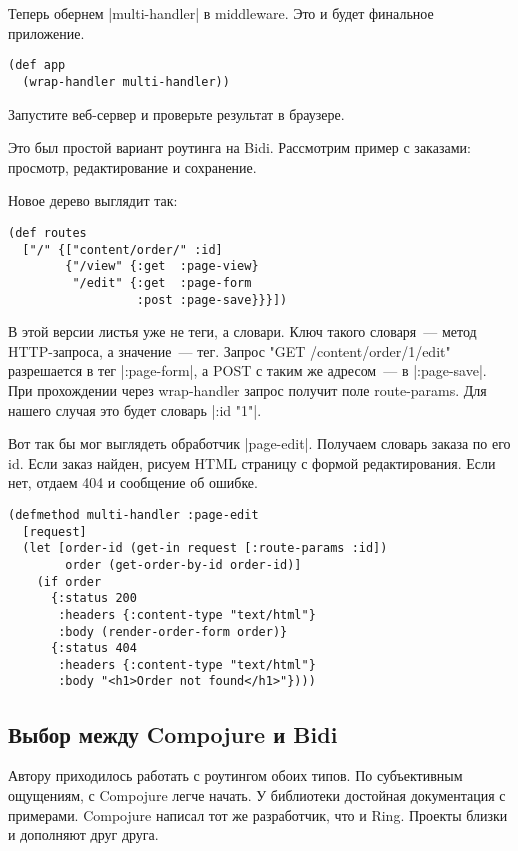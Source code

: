 Теперь обернем \spverb|multi-handler| в middleware. Это и будет финальное приложение.

\begin{verbatim}
(def app
  (wrap-handler multi-handler))
\end{verbatim}

Запустите веб-сервер и проверьте результат в браузере.

Это был простой вариант роутинга на Bidi. Рассмотрим пример с заказами:
просмотр, редактирование и сохранение.

Новое дерево выглядит так:

\begin{verbatim}
(def routes
  ["/" {["content/order/" :id]
        {"/view" {:get  :page-view}
         "/edit" {:get  :page-form
                  :post :page-save}}}])
\end{verbatim}

В этой версии листья уже не теги, а словари. Ключ такого словаря~--- метод
HTTP-запроса, а значение~--- тег. Запрос "GET /content/order/1/edit" разрешается в
тег \spverb|:page-form|, а POST с таким же адресом~--- в \spverb|:page-save|. При прохождении
через wrap-handler запрос получит поле route-params. Для нашего случая это будет
словарь \spverb|{:id "1"}|.

Вот так бы мог выглядеть обработчик \spverb|page-edit|. Получаем словарь заказа по его
id. Если заказ найден, рисуем HTML страницу с формой редактирования. Если нет,
отдаем 404 и сообщение об ошибке.

\begin{verbatim}
(defmethod multi-handler :page-edit
  [request]
  (let [order-id (get-in request [:route-params :id])
        order (get-order-by-id order-id)]
    (if order
      {:status 200
       :headers {:content-type "text/html"}
       :body (render-order-form order)}
      {:status 404
       :headers {:content-type "text/html"}
       :body "<h1>Order not found</h1>"})))
\end{verbatim}

\subsection{Выбор между Compojure и Bidi}

Автору приходилось работать с роутингом обоих типов. По субъективным ощущениям,
с Compojure легче начать. У библиотеки достойная документация с
примерами. Compojure написал тот же разработчик, что и Ring. Проекты близки и
дополняют друг друга.

